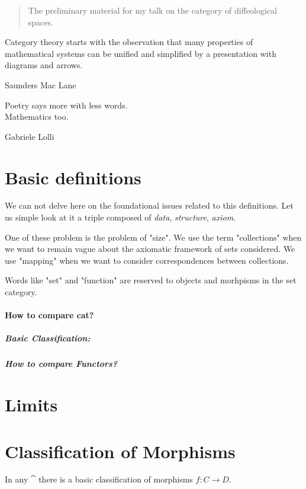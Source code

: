 \documentclass[a4paper,12pt,fleqn]{scrartcl}  %
\begin{document}
 
\begin{abstract}
	The preliminary material for my talk on the category of diffeological spaces.
\end{abstract}


\begin{appendices}
\epigraph{Category theory starts with the observation that many properties of mathematical systems can be unified and simplified by a presentation with diagrams and arrows.}{Saunders Mac Lane}
\epigraph{Poetry says more with less words.\\
Mathematics too.}{Gabriele Lolli}

\section{Basic definitions}
	
We can not delve here on the foundational issues related to this definitions. Let us simple look at it a triple composed of \emph{data}, \emph{structure}, \emph{axiom}.

One of these problem is the problem of "size". We use the term "collections" when we want to remain vague about the axiomatic framework of sets considered.
We use "mapping" when we want to consider correspondences between collections.

Words like "set" and "function" are reserved to objects and morhpisms in the set category.

\paragraph{How to compare cat?}
	

	\subparagraph{Basic Classification:}
	

\subparagraph{How to compare Functors?}
	

\section{Limits}
	

	


\section{Classification of Morphisms}
	In any $\cat$ there is a basic classification of morphisms $f: C \rightarrow D$.\\
	


\end{appendices}
\end{document}
